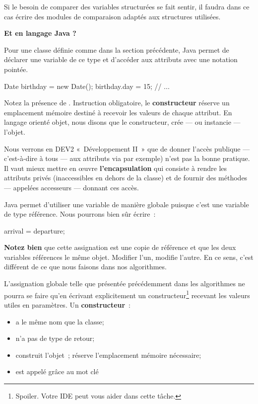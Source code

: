 		Si le besoin de comparer des variables structurées se fait sentir, il
		faudra dans ce cas écrire des modules de comparaison adaptés aux
		structures utilisées.

		\textbf{Et en langage Java ?}

		Pour une classe définie comme dans la section précédente, Java permet 
		de déclarer une variable de ce type et d'accéder aux attributs avec une
		notation pointée. 

		\begin{java}
Date birthday = new Date();
birthday.day = 15;
// ... 
		\end{java}

		Notez la présence de \textbf{}. Instruction obligatoire,
		le \textbf{constructeur} réserve un emplacement mémoire destiné
		à recevoir les valeurs de chaque attribut. En langage orienté objet,
		nous disons que le constructeur, crée — ou instancie — l'objet. 

		Nous verrons en DEV2 «~Développement II~» que de donner l'accès publique
		— c'est-à-dire à tous — aux attributs via  par exemple)
		n'est pas la bonne pratique. Il vaut mieux mettre en œuvre
		\textbf{l'encapsulation} qui consiste à rendre les attributs privés
		(inaccessibles en dehors de la classe) et de fournir des méthodes
		— appelées accesseurs — donnant ces accès. 

		Java permet d'utiliser une variable de manière globale puisque c'est une 
		variable de type référence. Nous pourrons bien sûr écrire~:

		\begin{java}
arrival = departure;			
		\end{java}

		\textbf{Notez bien} que cette assignation est une copie de référence et
		que les deux variables références le même objet. Modifier l'un, modifie
		l'autre. En ce sens, c'est différent de ce que nous faisons dans nos
		algorithmes. 

		L'assignation globale telle que présentée précédemment dans les
		algorithmes ne pourra se faire qu'en écrivant explicitement un
		constructeur\footnote{Spoiler. Votre IDE peut vous aider dans cette
		tâche.} recevant les valeurs utiles en paramètres. Un
		\textbf{constructeur}~:

		\begin{itemize}
			\item a le même nom que la classe;
			\item n'a pas de type de retour;
			\item construit l'objet~; réserve l'emplacement mémoire nécessaire;
			\item est appelé grâce au mot clé \textbf{}
		\end{itemize}

